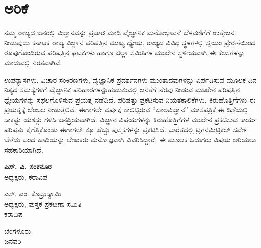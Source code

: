 
\chapter*{ಅರಿಕೆ}

ನಮ್ಮ ರಾಜ್ಯದ ಜನರಲ್ಲಿ ವಿಜ್ಞಾನವನ್ನು ಪ್ರಚಾರ ಮಾಡಿ ವೈಜ್ಞಾನಿಕ ಮನೋಭಾವನೆ ಬೆಳವಣಿಗೆಗೆ ಉತ್ತೇಜನ ನೀಡುವುದು ಕನಾಟಕ ರಾಜ್ಯ ವಿಜ್ಞಾನ ಪರಿಷತ್ತಿನ ಮುಖ್ಯ ಧ್ಯೇಯ. ರಾಜ್ಯದ ವಿವಿಧ ಸ್ಥಳಗಳಲ್ಲಿ ಸ್ವಯಂ ಪ್ರೇರಣೆಯಿಂದ ರೂಪುಗೊಂಡಿರುವ ಪರಿಷತ್ತಿನ ಘಟಕಗಳು ಹಾಗೂ ಜಿಲ್ಲಾ ಸಮಿತಿಗಳ ಮುಖೇನ ಸ್ಥಳೀಯವಾಗಿ ಈ ಕೆಲಸಗಳನ್ನು ಮಾಡುವಲ್ಲಿ ನಿರತವಾಗಿವೆ.

ಉಪನ್ಯಾಸಗಳು, ವಿಚಾರ ಸಂಕಿರಣಗಳು, ವೈಜ್ಞಾನಿಕ ಪ್ರದರ್ಶನಗಳು ಮುಂತಾದವು\-ಗಳನ್ನು ಏರ್ಪಡಿಸುವ ಮೂಲಕ ದಿನ ನಿತ್ಯದ ಸಮಸ್ಯೆಗಳಿಗೆ ವೈಜ್ಞಾನಿಕ ಪರಿಹಾರಗಳನ್ನು\break ಹುಡುಕುವಲ್ಲಿ ಜನತೆಗೆ ನೆರವು ನೀಡುವ ಮುಖೇನ ಪರಿಷತ್ತಿನ ಧ್ಯೇಯಗಳನ್ನು ಸಫಲ\-ಗೊಳಿಸುವ ಪ್ರಯತ್ನ ನಡೆದಿದೆ. ಪರಿಷತ್ತು ಪ್ರಕಟಿಸುವ ನಿಯತಕಾಲಿಕೆಗಳು, ಕಿರುಹೊತ್ತಿಗೆ\-ಗಳು ಈ ಪ್ರಯತ್ನಕ್ಕೆ ಬೆಂಬಲ ನೀಡುತ್ತಲಿವೆ. ಈಗಾಗಲೇ  ವರ್ಷಕ್ಕೆ ಕಾಲಿಟ್ಟಿರುವ “ಬಾಲವಿಜ್ಞಾನ” ಮಾಸಪತ್ರಿಕೆ ಈ ದಿಶೆಯಲ್ಲಿ ಸಾಕಷ್ಟು ಯಶಸ್ಸು ಗಳಿಸಿ ಜನಪ್ರಿಯವಾಗಿದೆ. ವಿಜ್ಞಾನ ವಿಷಯ\-ಗಳನ್ನು ಕಿರುಹೊತ್ತಿಗೆಗಳ ಮುಖೇನ ಪ್ರಕಟಿಸುವ ಕಾರ್ಯ ಪರಿಷತ್ತು ಕೈಗೆತ್ತಿಕೊಂಡು ಈಗಾಗಲೇ ಕ್ಕೂ ಹೆಚ್ಚು ಪುಸ್ತಕಗಳನ್ನು ಪ್ರಕಟಿಸಿದೆ. ಭಾರತದಲ್ಲಿ ಟ್ರಿಗನಮಿಟ್ರಿಕಲ್​ ಸರ್ವೇ ಬೆಳೆದು ಬಂದ ಹಾದಿಯನ್ನು ಲೇಖಕರು ಮನೋಜ್ಞವಾಗಿ ವಿವರಿಸಿದ್ದಾರೆ, ಈ ಮೂಲಕ ಓದುಗರು ವಿಷಯ ಅರಿಯಲು ಸಹಕಾರಿಯಾಗಿದೆ.

\bigskip

\begin{flushright}
\textbf{ಎಸ್. ವಿ. ಸಂಕನೂರ}\\ ಅಧ್ಯಕ್ಷರು, ಕರಾವಿಪ
\end{flushright}

\vskip -1.6cm

\noindent
ಎಸ್. ಎಂ. ಕೊಟ್ರುಸ್ವಾಮಿ \\ ಅಧ್ಯಕ್ಷರು, ಪುಸ್ತಕ ಪ್ರಕಟಣಾ ಸಮಿತಿ \\ ಕರಾವಿಪ 

\medskip

\noindent
ಬೆಂಗಳೂರು \\ ಜನವರಿ 

